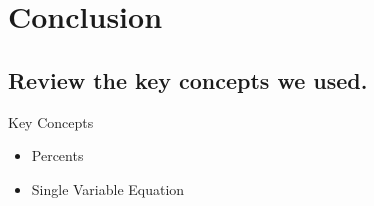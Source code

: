 \documentclass{beamer} %
\begin{document}
\setcounter{equation}{0}

\section{Conclusion}

\subsection*{Review the key concepts we used.}

\begin{frame}{Key Concepts}
  \begin{itemize}
  \item Percents
  \item Single Variable Equation
  \end{itemize}
\end{frame}
\end{document}
